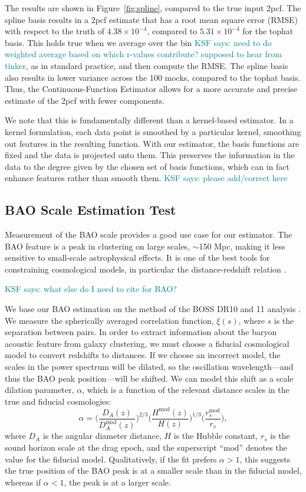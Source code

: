\documentclass[modern]{aastex62}
\newcommand{\cf}{2pcf\xspace} %
\newcommand{\est}{the Continuous-Function Estimator\xspace}
\newcommand{\KSF}[1]{\textcolor{teal}{KSF says: #1}}
\begin{document}
The results are shown in Figure~\ref{fig:spline}, compared to the true input \cf.
The spline basis results in a \cf estimate that has a root mean square error (RMSE) with respect to the truth of $4.38 \times 10^{-4}$, compared to $5.31 \times 10^{-4}$ for the tophat basis.
This holds true when we average over the bin \KSF{need to do weighted average based on which r-values contribute? supposed to hear from tinker}, as in standard practice, and then compute the RMSE.
The spline basis also results in lower variance across the 100 mocks, compared to the tophat basis.
Thus, \est allows for a more accurate and precise estimate of the \cf with fewer components.

We note that this is fundamentally different than a kernel-based estimator.
In a kernel formulation, each data point is smoothed by a particular kernel, smoothing out features in the resulting function.
With our estimator, the basis functions are fixed and the data is projected onto them.
This preserves the information in the data to the degree given by the chosen set of basis functions, which can in fact enhance features rather than smooth them.
\KSF{please add/correct here}

\subsection{BAO Scale Estimation Test}

Measurement of the BAO scale provides a good use case for our estimator.
The BAO feature is a peak in clustering on large scales, $\sim$150 Mpc, making it less sensitive to small-scale astrophysical effects.
It is one of the best tools for constraining cosmological models, in particular the distance-redshift relation \citep{Kazin2010, Anderson2012, Anderson2014, Alam2016}.

\KSF{what else do I need to cite for BAO?}

We base our BAO estimation on the method of the BOSS DR10 and 11 analysis \citep{Anderson2014}.
We measure the spherically averaged correlation function, $\xi(s)$, where $s$ is the separation between pairs.
In order to extract information about the baryon acoustic feature from galaxy clustering, we must choose a fiducial cosmological model to convert redshifts to distances.
If we choose an incorrect model, the scales in the power spectrum will be dilated, so the oscillation wavelength---and thus the BAO peak position---will be shifted.
We can model this shift as a scale dilation parameter, $\alpha$, which is a function of the relevant distance scales in the true and fiducial cosmologies:
\begin{equation}
\alpha = \Bigg( \frac{D_A(z)}{D_A^{\text{mod}}(z)} \Bigg)^{2/3} \Bigg( \frac{H^{\text{mod}}(z)}{H(z)} \Bigg)^{1/3} \Bigg( \frac{r_s^{\text{mod}}}{r_s} \Bigg),
\end{equation}
where $D_A$ is the angular diameter distance, $H$ is the Hubble constant, $r_s$ is the sound horizon scale at the drag epoch, and the superscript ``$\text{mod}$'' denotes the value for the fiducial model.
Qualitatively, if the fit prefers $\alpha>1$, this suggests the true position of the BAO peak is at a smaller scale than in the fiducial model, whereas if $\alpha<1$, the peak is at a larger scale.
\end{document}
